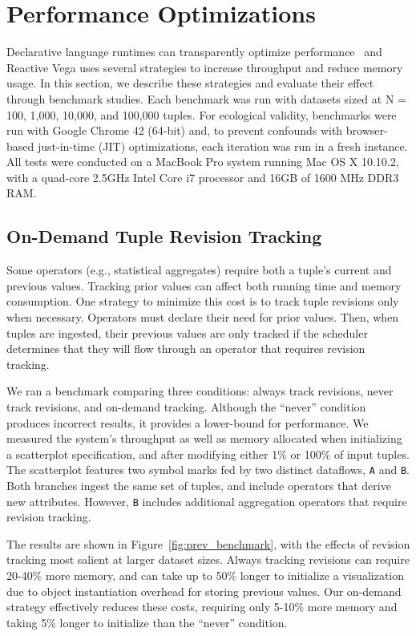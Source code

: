 \section{Performance Optimizations}
\label{sec:vg:optimizations}

Declarative language runtimes can transparently optimize
performance~\cite{heer:protovisjava} and Reactive Vega uses several strategies
to increase throughput and reduce memory usage. In this section, we describe
these strategies and evaluate their effect through benchmark studies. Each
benchmark was run with datasets sized at N = 100, 1,000, 10,000, and 100,000
tuples. For ecological validity, benchmarks were run with Google Chrome 42
(64-bit) and, to prevent confounds with browser-based just-in-time (JIT)
optimizations, each iteration was run in a fresh instance. All tests were
conducted on a MacBook Pro system running Mac OS X 10.10.2, with a quad-core
2.5GHz Intel Core i7 processor and 16GB of 1600 MHz DDR3 RAM.

\subsection{On-Demand Tuple Revision Tracking}

Some operators (e.g., statistical aggregates) require both a tuple's current and
previous values. Tracking prior values can affect both running time and memory
consumption. One strategy to minimize this cost is to track tuple revisions only
when necessary. Operators must declare their need for prior values. Then, when
tuples are ingested, their previous values are only tracked if the scheduler
determines that they will flow through an operator that requires revision
tracking.

We ran a benchmark comparing three conditions: always track revisions, never
track revisions, and on-demand tracking. Although the ``never'' condition
produces incorrect results, it provides a lower-bound for performance. We
measured the system's throughput as well as memory allocated when initializing a
scatterplot specification, and after modifying either 1\% or 100\% of input
tuples. The scatterplot features two symbol marks fed by two distinct dataflows,
\texttt{A} and \texttt{B}. Both branches ingest the same set of tuples, and
include operators that derive new attributes. However, \texttt{B} includes
additional aggregation operators that require revision tracking.

The results are shown in Figure~\ref{fig:prev_benchmark}, with the effects of
revision tracking most salient at larger dataset sizes. Always tracking
revisions can require 20-40\% more memory, and can take up to 50\% longer to
initialize a visualization due to object instantiation overhead for storing
previous values. Our on-demand strategy effectively reduces these costs,
requiring only 5-10\% more memory and taking 5\% longer to initialize than the
``never'' condition.

